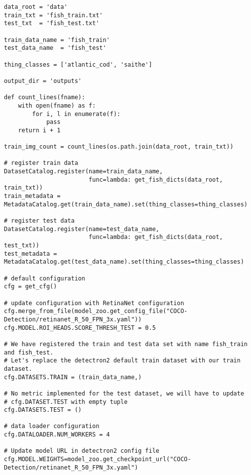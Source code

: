 \label{lst:config}

\begin{verbatim}
data_root = 'data'
train_txt = 'fish_train.txt'
test_txt  = 'fish_test.txt'

train_data_name = 'fish_train'
test_data_name  = 'fish_test'

thing_classes = ['atlantic_cod', 'saithe']

output_dir = 'outputs'

def count_lines(fname):
    with open(fname) as f:
        for i, l in enumerate(f):
            pass
    return i + 1

train_img_count = count_lines(os.path.join(data_root, train_txt))

# register train data
DatasetCatalog.register(name=train_data_name,
                        func=lambda: get_fish_dicts(data_root, train_txt))
train_metadata = MetadataCatalog.get(train_data_name).set(thing_classes=thing_classes)

# register test data
DatasetCatalog.register(name=test_data_name,
                        func=lambda: get_fish_dicts(data_root, test_txt))
test_metadata = MetadataCatalog.get(test_data_name).set(thing_classes=thing_classes)

# default configuration
cfg = get_cfg()

# update configuration with RetinaNet configuration
cfg.merge_from_file(model_zoo.get_config_file("COCO-Detection/retinanet_R_50_FPN_3x.yaml"))
cfg.MODEL.ROI_HEADS.SCORE_THRESH_TEST = 0.5

# We have registered the train and test data set with name fish_train and fish_test.
# Let's replace the detectron2 default train dataset with our train dataset.
cfg.DATASETS.TRAIN = (train_data_name,)

# No metric implemented for the test dataset, we will have to update
# cfg.DATASET.TEST with empty tuple
cfg.DATASETS.TEST = ()

# data loader configuration
cfg.DATALOADER.NUM_WORKERS = 4

# Update model URL in detectron2 config file
cfg.MODEL.WEIGHTS=model_zoo.get_checkpoint_url("COCO-Detection/retinanet_R_50_FPN_3x.yaml")
\end{verbatim}

